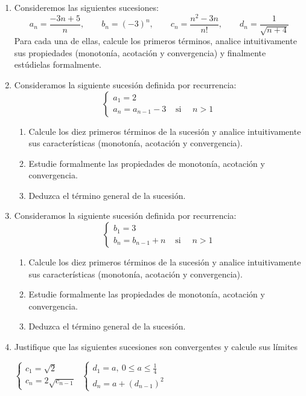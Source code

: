 \begin{enumerate}

\item Consideremos las siguientes sucesiones:
\[
a_n=\frac{-3n+5}{n},\qquad 
b_n=(-3)^n,\qquad 
c_n=\frac{n^2-3n}{n!},\qquad 
d_n=\frac{1}{\sqrt{n+4}}
\]
Para cada una de ellas, calcule los primeros términos, analice intuitivamente sus propiedades (monotonía, acotación y convergencia) y finalmente estúdielas formalmente.



\item
Consideramos la siguiente sucesión definida por recurrencia:
\[
\begin{cases}
a_1=2\\
a_n=a_{n-1}-3 & \text{ si }\quad n>1
\end{cases}
\]
\begin{enumerate}
\item
Calcule los diez primeros términos de la sucesión y analice intuitivamente sus características (monotonía, acotación y convergencia).
\item
Estudie formalmente las propiedades de monotonía, acotación y convergencia. 
\item
Deduzca el término general de la sucesión.
\end{enumerate} 

\item
Consideramos la siguiente sucesión definida por recurrencia:
\[
\begin{cases}
b_1=3\\
b_n=b_{n-1}+n & \text{ si }\quad n>1
\end{cases}
\]
\begin{enumerate}
\item
Calcule los diez primeros términos de la sucesión y analice intuitivamente sus características (monotonía, acotación y convergencia).
\item
Estudie formalmente las propiedades de monotonía, acotación y convergencia. 
\item
Deduzca el término general de la sucesión.
\end{enumerate} 

\item
Justifique que las siguientes sucesiones son convergentes y calcule sus límites
\begin{center}
$\begin{cases}
c_1 = \sqrt2\\
c_n =2\sqrt{c_{n-1}}
\end{cases}$\qquad\qquad
$\begin{cases}
\mathit{d}_1=a,\ 0\le a\le\frac14\\
\mathit{d}_n=a+(\mathit{d}_{n-1})^2
\end{cases}$
\end{center}


\end{enumerate}
